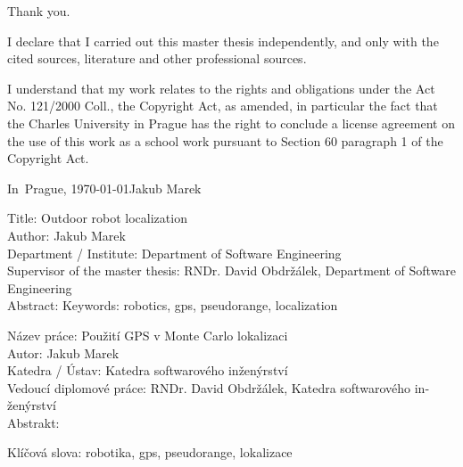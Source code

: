 \pagestyle{empty}

\vspace{10mm} 

\noindent Thank you.
\newpage

\vspace*{\fill}
I declare that I carried out this master thesis independently, and only with the cited
sources, literature and other professional sources.

I understand that my work relates to the rights and obligations under the Act No.
121/2000 Coll., the Copyright Act, as amended, in particular the fact that the Charles
University in Prague has the right to conclude a license agreement on the use of this
work as a school work pursuant to Section 60 paragraph 1 of the Copyright Act.

\vspace{10mm} 
\noindent In~Prague, \today\hspace{\fill}Jakub Marek\\
\newpage

\tableofcontents*
\newpage

\noindent
Title: Outdoor robot localization\\
Author: Jakub Marek\\
Department / Institute: Department of Software Engineering\\
Supervisor of the master thesis: RNDr. David Obdržálek, Department of Software Engineering\\

\noindent Abstract: 
\noindent Keywords: robotics, gps, pseudorange, localization

\vspace{25mm}

\begin{otherlanguage}{czech}
\noindent
Název práce: Použití GPS v Monte Carlo lokalizaci\\
Autor: Jakub Marek\\
Katedra / Ústav: Katedra softwarového inženýrství\\
Vedoucí diplomové práce: RNDr. David Obdržálek, Katedra softwarového inženýrství\\

\noindent Abstrakt: 

\noindent Klíčová slova: robotika, gps, pseudorange, lokalizace
\end{otherlanguage}

\newpage

\pagestyle{plain}
\setcounter{page}{1}
